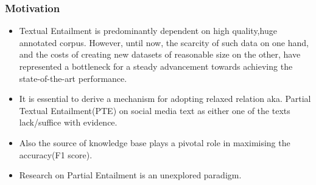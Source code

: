 \documentclass{beamer}
\begin{document}
\begin{frame}\frametitle{Motivation}
  
    \begin{itemize}
\item Textual Entailment is predominantly dependent on high quality,huge annotated corpus. However, until now, the scarcity of such data on one hand, and the costs of creating new datasets of reasonable size on the other, have represented a bottleneck for a steady advancement
towards achieving the state-of-the-art performance.
\item It is essential to derive a mechanism for adopting relaxed relation aka. Partial Textual Entailment(PTE) on social media text as either one of the texts lack/suffice with evidence.
\item Also the source of knowledge base plays a pivotal role in maximising the accuracy(F1 score).
\item Research on Partial Entailment is an unexplored paradigm.
\end{itemize}
\end{frame}
\end{document}
